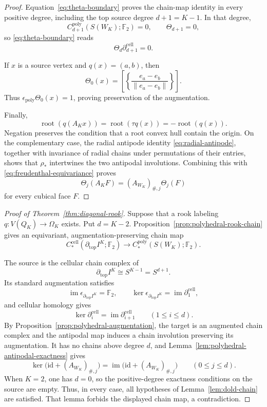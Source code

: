 \documentclass[reqno,12pt]{amsart}
\theoremstyle{definition}
\newcommand{\F}{\mathbb F_2}
\newcommand{\id}{\mathrm{id}}
\newcommand{\cell}{\mathrm{cell}}
\begin{document}
\begin{proof}
Equation~\eqref{eq:theta-boundary} proves the chain-map identity in
every positive degree, including the top source degree
\(d+1=K-1\).  In that degree,
\[
 C_{d+1}^{\mathrm{poly}}(S(W_K);\F)=0,
 \qquad
 \Theta_{d+1}=0,
\]
so \eqref{eq:theta-boundary} reads
\[
 \Theta_d\partial_{d+1}^{\cell}=0.
\]

If \(x\) is a source vertex and \(q(x)=(a,b)\), then
\[
 \Theta_0(x)
 =\left[\left\{\frac{e_a-e_b}{\|e_a-e_b\|}\right\}\right].
\]
Thus \(\epsilon_{\mathrm{poly}}\Theta_0(x)=1\), proving preservation
of the augmentation.

Finally,
\[
 \operatorname{root}(q(A_Kx))
 =\operatorname{root}(\tau q(x))
 =-\operatorname{root}(q(x)).
\]
Negation preserves the condition that a root convex hull contain the
origin.  On the complementary case, the radial antipode identity
\eqref{eq:radial-antipode}, together with invariance of radial chains
under permutations of their entries, shows that \(\rho_*\) intertwines
the two antipodal involutions.  Combining this with
\eqref{eq:freudenthal-equivariance} proves
\[
 \Theta_j(A_KF)=(A_{W_K})_{\#,j}\Theta_j(F)
\]
for every cubical face \(F\).
\end{proof}

\begin{proof}[Proof of Theorem~\ref{thm:diagonal-rook}]
Suppose that a rook labeling \(q:V(Q_K)\to\Omega_K\) exists.  Put
\(d=K-2\).  Proposition~\ref{prop:polyhedral-rook-chain} gives an
equivariant, augmentation-preserving chain map
\[
 C_*^{\cell}(\partial_{\mathrm{top}}I^K;\F)
 \longrightarrow C_*^{\mathrm{poly}}(S(W_K);\F).
\]

The source is the cellular chain complex of
\[
 \partial_{\mathrm{top}}I^K\cong S^{K-1}=S^{d+1}.
\]
Its standard augmentation satisfies
\[
 \operatorname{im}\epsilon_{\partial_{\mathrm{top}}I^K}=\F,
 \qquad
 \ker\epsilon_{\partial_{\mathrm{top}}I^K}
 =\operatorname{im}\partial_1^{\cell},
\]
and cellular homology gives
\[
 \ker\partial_i^{\cell}
 =\operatorname{im}\partial_{i+1}^{\cell}
 \qquad(1\leq i\leq d).
\]
By Proposition~\ref{prop:polyhedral-augmentation}, the target is an
augmented chain complex and the antipodal map induces a chain
involution preserving its augmentation.  It has no chains above
degree \(d\), and
Lemma~\ref{lem:polyhedral-antipodal-exactness} gives
\[
 \ker\bigl(\id+(A_{W_K})_{\#,j}\bigr)
 =\operatorname{im}\bigl(\id+(A_{W_K})_{\#,j}\bigr)
 \qquad(0\leq j\leq d).
\]
When \(K=2\), one has \(d=0\), so the positive-degree exactness
conditions on the source are empty.  Thus, in every case, all
hypotheses of Lemma~\ref{lem:dold-chain} are satisfied.
That lemma forbids the displayed chain map, a contradiction.
\end{proof}
\end{document}
